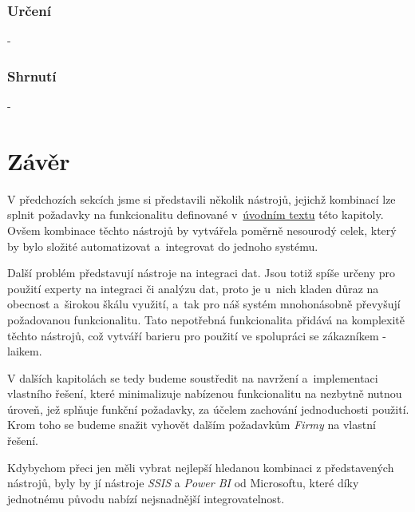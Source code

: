 \subsubsection{Určení} 
- 

\subsubsection{Shrnutí}
- 


\section{Závěr}\label{sec:AnalysEnd}

V předchozích sekcích jsme si představili několik nástrojů, jejichž kombinací lze splnit požadavky na funkcionalitu definované v~\hyperref[chap:analysis]{úvodním textu} této kapitoly. 
Ovšem kombinace těchto nástrojů by vytvářela poměrně nesourodý celek, který by bylo složité automatizovat a~integrovat do jednoho systému. 

Další problém představují nástroje na integraci dat.
Jsou totiž spíše určeny pro použití experty na integraci či analýzu dat, proto je u~nich kladen důraz na obecnost a~širokou škálu využití, a~tak pro náš systém mnohonásobně převyšují požadovanou funkcionalitu.
Tato nepotřebná funkcionalita přidává na komplexitě těchto nástrojů, což vytváří barieru pro použití ve spolupráci se zákazníkem - laikem.

V dalších kapitolách se tedy budeme soustředit na navržení a~implementaci vlastního řešení, které minimalizuje nabízenou funkcionalitu na nezbytně nutnou úroveň, jež splňuje funkční požadavky, za účelem zachování jednoduchosti použití.
Krom toho se budeme snažit vyhovět dalším požadavkům \textit{Firmy} na vlastní řešení.

Kdybychom přeci jen měli vybrat nejlepší hledanou kombinaci z představených nástrojů, byly by jí nástroje \textit{SSIS} a \textit{Power BI} od Microsoftu, které díky jednotnému původu nabízí nejsnadnější integrovatelnost.
